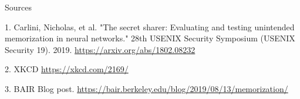 \documentclass{beamer}
\begin{document}
\begin{frame}{Sources}
\begin{thebibliography}{0}

   1. Carlini, Nicholas, et al. "The secret sharer: Evaluating and testing unintended memorization in neural networks." 28th {USENIX} Security Symposium ({USENIX} Security 19). 2019. \url{https://arxiv.org/abs/1802.08232} 
  
   2. XKCD \url{https://xkcd.com/2169/}
  
   3. BAIR Blog post. \url{https://bair.berkeley.edu/blog/2019/08/13/memorization/}
  
\end{thebibliography}

\end{frame}

 
\end{document}
